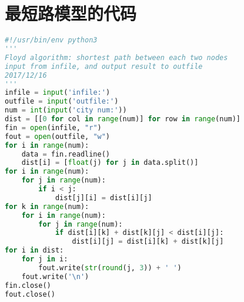 \documentclass[UTF8,cs4size]{ctexart}
\begin{document}
\section{最短路模型的代码} \label{se:short}
\begin{lstlisting}[language=Python]
#!/usr/bin/env python3
'''
Floyd algorithm: shortest path between each two nodes
input from infile, and output result to outfile
2017/12/16
'''
infile = input('infile:')
outfile = input('outfile:')
num = int(input('city num:'))
dist = [[0 for col in range(num)] for row in range(num)]
fin = open(infile, "r")
fout = open(outfile, "w")
for i in range(num):
    data = fin.readline()
    dist[i] = [float(j) for j in data.split()]
for i in range(num):
    for j in range(num):
        if i < j:
            dist[j][i] = dist[i][j]
for k in range(num):
    for i in range(num):
        for j in range(num):
            if dist[i][k] + dist[k][j] < dist[i][j]:
                dist[i][j] = dist[i][k] + dist[k][j] 
for i in dist:
    for j in i:
        fout.write(str(round(j, 3)) + ' ')
    fout.write('\n')
fin.close()
fout.close()
\end{lstlisting}
\clearpage
\end{document}
